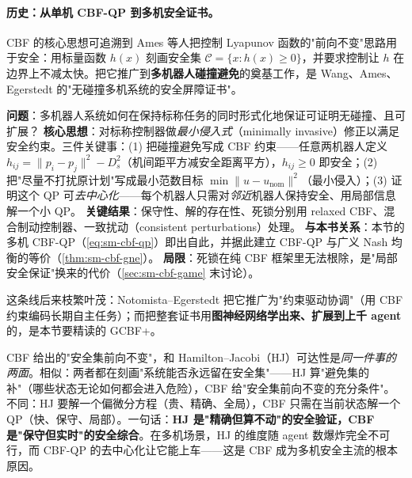 \paragraph{历史：从单机 CBF-QP 到多机安全证书。}
CBF 的核心思想可追溯到 Ames 等人把控制 Lyapunov 函数的"前向不变"思路用于安全\cite{ames2017cbf}：用标量函数 $h(x)$ 刻画安全集 $\mathcal{C}=\{x:h(x)\ge0\}$，并要求控制让 $h$ 在边界上不减太快。把它推广到\textbf{多机器人碰撞避免}的奠基工作，是 Wang、Ames、Egerstedt 的"无碰撞多机系统的安全屏障证书"\cite{wang2017safety}。

\begin{paper}\label{paper:wang2017}
\textbf{问题}：多机器人系统如何在保持标称任务的同时形式化地保证可证明无碰撞、且可扩展？
\textbf{核心思想}：对标称控制器做\emph{最小侵入式}（minimally invasive）修正以满足安全约束。三件关键事：(1) 把碰撞避免写成 CBF 约束——任意两机器人定义 $h_{ij}=\|p_i-p_j\|^2-D_s^2$（机间距平方减安全距离平方），$h_{ij}\ge0$ 即安全；(2) 把"尽量不打扰原计划"写成最小范数目标 $\min\|u-u_{\text{nom}}\|^2$（最小侵入）；(3) 证明这个 QP 可\emph{去中心化}——每个机器人只需对\emph{邻近}机器人保持安全、用局部信息解一个小 QP。
\textbf{关键结果}：保守性、解的存在性、死锁分别用 relaxed CBF、混合制动控制器、一致扰动（consistent perturbations）处理。
\textbf{与本书关系}：本节的多机 CBF-QP（\cref{eq:sm-cbf-qp}）即出自此，并据此建立 CBF-QP 与广义 Nash 均衡的等价（\cref{thm:sm-cbf-gne}）。
\textbf{局限}：死锁在纯 CBF 框架里无法根除，是"局部安全保证"换来的代价（\cref{sec:sm-cbf-game} 末讨论）。
\end{paper}

这条线后来枝繁叶茂：Notomista--Egerstedt 把它推广为"约束驱动协调"（用 CBF 约束编码长期自主任务）\cite{notomista2019constraint}；而把整套证书用\textbf{图神经网络学出来、扩展到上千 agent} 的，是本节要精读的 GCBF+\cite{zhang2025gcbfplus}。

\begin{insight}
CBF 给出的"安全集前向不变"，和 Hamilton--Jacobi（HJ）可达性是\emph{同一件事的两面}。相似：两者都在刻画"系统能否永远留在安全集"——HJ 算"避免集的补"（哪些状态无论如何都会进入危险），CBF 给"安全集前向不变的充分条件"。不同：HJ 要解一个偏微分方程（贵、精确、全局），CBF 只需在当前状态解一个 QP（快、保守、局部）。一句话：\textbf{HJ 是"精确但算不动"的安全验证，CBF 是"保守但实时"的安全综合}。在多机场景，HJ 的维度随 agent 数爆炸完全不可行，而 CBF-QP 的去中心化让它能上车——这是 CBF 成为多机安全主流的根本原因。
\end{insight}

